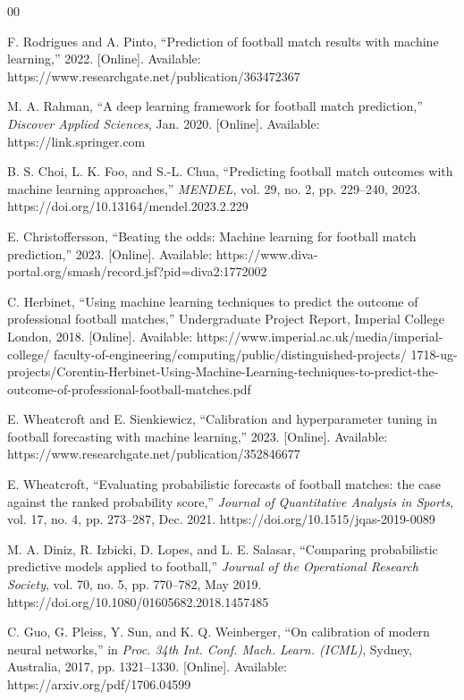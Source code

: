 \documentclass[conference]{IEEEtran}
\begin{document}
\begin{thebibliography}{00}

 F. Rodrigues and A. Pinto, ``Prediction of football
match results with machine learning,'' 2022. [Online]. Available:
https://www.researchgate.net/publication/363472367

 M. A. Rahman, ``A deep learning framework for
football match prediction,'' \textit{Discover Applied Sciences},
Jan. 2020. [Online]. Available: https://link.springer.com

 B. S. Choi, L. K. Foo, and S.-L. Chua, ``Predicting
football match outcomes with machine learning approaches,''
\textit{MENDEL}, vol. 29, no. 2, pp. 229--240, 2023.
https://doi.org/10.13164/mendel.2023.2.229

 E. Christoffersson, ``Beating the odds: Machine
learning for football match prediction,'' 2023. [Online].
Available: https://www.diva-portal.org/smash/record.jsf?pid=diva2:1772002

 C. Herbinet, ``Using machine learning techniques to
predict the outcome of professional football matches,''
Undergraduate Project Report, Imperial College London, 2018.
[Online]. Available: https://www.imperial.ac.uk/media/imperial-college/
faculty-of-engineering/computing/public/distinguished-projects/
1718-ug-projects/Corentin-Herbinet-Using-Machine-Learning-techniques-to-predict-the-outcome-of-professional-football-matches.pdf

 E. Wheatcroft and E. Sienkiewicz, ``Calibration and
hyperparameter tuning in football forecasting with machine
learning,'' 2023. [Online]. Available:
https://www.researchgate.net/publication/352846677

 E. Wheatcroft, ``Evaluating probabilistic forecasts
of football matches: the case against the ranked probability
score,'' \textit{Journal of Quantitative Analysis in Sports},
vol. 17, no. 4, pp. 273--287, Dec. 2021.
https://doi.org/10.1515/jqas-2019-0089

 M. A. Diniz, R. Izbicki, D. Lopes, and L. E.
Salasar, ``Comparing probabilistic predictive models applied to
football,'' \textit{Journal of the Operational Research Society},
vol. 70, no. 5, pp. 770--782, May 2019.
https://doi.org/10.1080/01605682.2018.1457485

 C. Guo, G. Pleiss, Y. Sun, and K. Q. Weinberger,
``On calibration of modern neural networks,'' in \textit{Proc.
34th Int. Conf. Mach. Learn. (ICML)}, Sydney, Australia, 2017,
pp. 1321--1330. [Online]. Available:
https://arxiv.org/pdf/1706.04599


\end{thebibliography}
\end{document}

